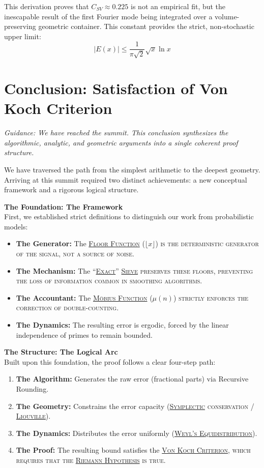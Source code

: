 \documentclass[sn-mathphys-num, pdflatex, referee]{sn-jnl}
\newcommand{\gterm}[2]{\begingroup\normalfont\scshape\hyperlink{#1}{#2}\endgroup}
\begin{document}
This derivation proves that $C_{SV} \approx 0.225$ is not an empirical fit, but the inescapable result of the first Fourier mode being integrated over a volume-preserving geometric container.
This constant provides the strict, non-stochastic upper limit:
\begin{equation}
|E(x)| \le \frac{1}{\pi\sqrt{2}} \sqrt{x} \ln x
\end{equation}

\section{Conclusion: Satisfaction of Von Koch Criterion}

\textit{Guidance: We have reached the summit. This conclusion synthesizes the algorithmic, analytic, and geometric arguments into a single coherent proof structure.} 

We have traversed the path from the simplest arithmetic to the deepest geometry. Arriving at this summit required two distinct achievements: a new conceptual framework and a rigorous logical structure.

\textbf{The Foundation: The Framework}\\
First, we established strict definitions to distinguish our work from probabilistic models:
\begin{itemize}
    \item \textbf{The Generator:} The \gterm{floor_function}{Floor Function} ($\lfloor x \rfloor$) is the deterministic generator of the signal, not a source of noise.
    \item \textbf{The Mechanism:} The ``\gterm{exact_sieve}{Exact}'' \gterm{exact_sieve}{Sieve} preserves these floors, preventing the loss of information common in smoothing algorithms.
    \item \textbf{The Accountant:} The \gterm{MF}{Möbius Function} ($\mu(n)$) strictly enforces the correction of double-counting.
    \item \textbf{The Dynamics:} The resulting error is ergodic, forced by the linear independence of primes to remain bounded.
\end{itemize}

\textbf{The Structure: The Logical Arc}\\
Built upon this foundation, the proof follows a clear four-step path:
\begin{enumerate}
    \item \textbf{The Algorithm:} Generates the raw error (fractional parts) via Recursive Rounding.
    \item \textbf{The Geometry:} Constrains the error capacity (\gterm{geometry}{Symplectic} conservation / \gterm{liouville}{Liouville}).
    \item \textbf{The Dynamics:} Distributes the error uniformly (\gterm{weyl}{Weyl's Equidistribution}).
    \item \textbf{The Proof:} The resulting bound satisfies the \gterm{von_koch}{Von Koch Criterion}, which requires that the \gterm{rh}{Riemann Hypothesis} is true.
\end{enumerate}
\end{document}
